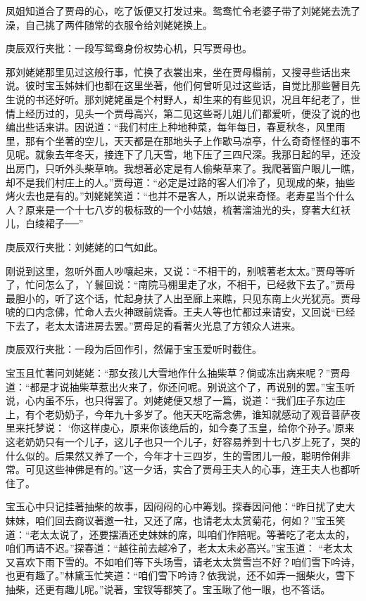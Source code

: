 \begin{parag}
    凤姐知道合了贾母的心，吃了饭便又打发过来。鸳鸯忙令老婆子带了刘姥姥去洗了澡，自己挑了两件随常的衣服令给刘姥姥换上。\begin{note}庚辰双行夹批：一段写鸳鸯身份权势心机，只写贾母也。\end{note}那刘姥姥那里见过这般行事，忙换了衣裳出来，坐在贾母榻前，又搜寻些话出来说。彼时宝玉姊妹们也都在这里坐著，他们何曾听见过这些话，自觉比那些瞽目先生说的书还好听。那刘姥姥虽是个村野人，却生来的有些见识，况且年纪老了，世情上经历过的，见头一个贾母高兴，第二见这些哥儿姐儿们都爱听，便没了说的也编出些话来讲。因说道：“我们村庄上种地种菜，每年每日，春夏秋冬，风里雨里，那有个坐著的空儿，天天都是在那地头子上作歇马凉亭，什么奇奇怪怪的事不见呢。就象去年冬天，接连下了几天雪，地下压了三四尺深。我那日起的早，还没出房门，只听外头柴草响。我想著必定是有人偷柴草来了。我爬著窗户眼儿一瞧，却不是我们村庄上的人。”贾母道：“必定是过路的客人们冷了，见现成的柴，抽些烤火去也是有的。”刘姥姥笑道：“也并不是客人，所以说来奇怪。老寿星当个什么人？原来是一个十七八岁的极标致的一个小姑娘，梳著溜油光的头，穿著大红袄儿，白绫裙子──”\begin{note}庚辰双行夹批：刘姥姥的口气如此。\end{note}刚说到这里，忽听外面人吵嚷起来，又说：“不相干的，别唬著老太太。”贾母等听了，忙问怎么了，丫鬟回说：“南院马棚里走了水，不相干，已经救下去了。”贾母最胆小的，听了这个话，忙起身扶了人出至廊上来瞧，只见东南上火光犹亮。贾母唬的口内念佛，忙命人去火神跟前烧香。王夫人等也忙都过来请安，又回说“已经下去了，老太太请进房去罢。”贾母足的看著火光息了方领众人进来。\begin{note}庚辰双行夹批：一段为后回作引，然偏于宝玉爱听时截住。\end{note}宝玉且忙著问刘姥姥：“那女孩儿大雪地作什么抽柴草？倘或冻出病来呢？”贾母道：“都是才说抽柴草惹出火来了，你还问呢。别说这个了，再说别的罢。”宝玉听说，心内虽不乐，也只得罢了。刘姥姥便又想了一篇，说道：“我们庄子东边庄上，有个老奶奶子，今年九十多岁了。他天天吃斋念佛，谁知就感动了观音菩萨夜里来托梦说： ‘你这样虔心，原来你该绝后的，如今奏了玉皇，给你个孙子。’原来这老奶奶只有一个儿子，这儿子也只一个儿子，好容易养到十七八岁上死了，哭的什么似的。后果然又养了一个，今年才十三四岁，生的雪团儿一般，聪明伶俐非常。可见这些神佛是有的。”这一夕话，实合了贾母王夫人的心事，连王夫人也都听住了。
\end{parag}


\begin{parag}
    宝玉心中只记挂著抽柴的故事，因闷闷的心中筹划。探春因问他：“昨日扰了史大妹妹，咱们回去商议著邀一社，又还了席，也请老太太赏菊花，何如？”宝玉笑道：“老太太说了，还要摆酒还史妹妹的席，叫咱们作陪呢。等著吃了老太太的，咱们再请不迟。”探春道：“越往前去越冷了，老太太未必高兴。”宝玉道： “老太太又喜欢下雨下雪的。不如咱们等下头场雪，请老太太赏雪岂不好？咱们雪下吟诗，也更有趣了。”林黛玉忙笑道：“咱们雪下吟诗？依我说，还不如弄一捆柴火，雪下抽柴，还更有趣儿呢。”说著，宝钗等都笑了。宝玉瞅了他一眼，也不答话。
\end{parag}


